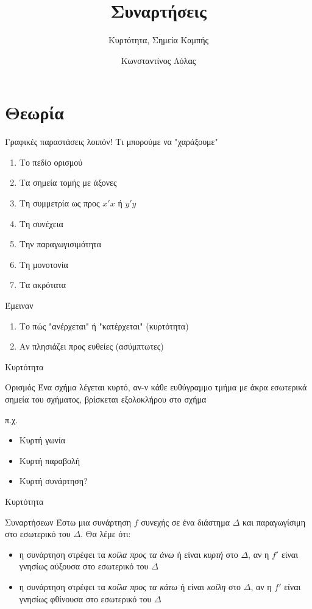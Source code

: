 \documentclass{../presentation}
\title{Συναρτήσεις}
\subtitle{Κυρτότητα, Σημεία Καμπής}
\author[Λόλας]{Κωνσταντίνος Λόλας}
\institute[$10^ο$ ΓΕΛ]{$10^ο$ ΓΕΛ Θεσσαλονίκης}
\date{}
\begin{document}
\begin{frame}
  \titlepage
\end{frame}

\section{Θεωρία}
\begin{frame}{Γραφικές παραστάσεις λοιπόν!}
  Τι μπορούμε να "χαράξουμε"
  \begin{enumerate}
    \item Το πεδίο ορισμού
    \item Τα σημεία τομής με άξονες
    \item Τη συμμετρία ως προς $x'x$ ή $y'y$
    \item Τη συνέχεια
    \item Την παραγωγισιμότητα
    \item Τη μονοτονία
    \item Τα ακρότατα
  \end{enumerate}
   Έμειναν
  \begin{enumerate}
    \item<3-> Το πώς "ανέρχεται" ή "κατέρχεται" (κυρτότητα)
    \item<4-> Αν πλησιάζει προς ευθείες (ασύμπτωτες)
  \end{enumerate}
\end{frame}

\begin{frame}{Κυρτότητα}
  \begin{block}{Ορισμός}
    Ένα σχήμα λέγεται κυρτό, αν-ν κάθε ευθύγραμμο τμήμα με άκρα εσωτερικά σημεία του σχήματος, βρίσκεται εξολοκλήρου στο σχήμα
  \end{block}
   π.χ.
  \begin{itemize}
    \item<3-> Κυρτή γωνία 
    \item<5-> Κυρτή παραβολή 
    \item<7-> Κυρτή συνάρτηση?
  \end{itemize}
\end{frame}

\begin{frame}{Κυρτότητα}
  \begin{block}{Συναρτήσεων}
    Έστω μια συνάρτηση $f$ συνεχής σε ένα διάστημα $Δ$ και παραγωγίσιμη στο εσωτερικό του $Δ$. Θα λέμε ότι:
    \begin{itemize}
      \item η συνάρτηση στρέφει τα \emph{κοίλα προς τα άνω} ή είναι \emph{κυρτή} στο $Δ$, αν η $f'$ είναι γνησίως αύξουσα στο εσωτερικό του $Δ$
      \item η συνάρτηση στρέφει τα \emph{κοίλα προς τα κάτω} ή είναι \emph{κοίλη} στο $Δ$, αν η $f'$ είναι γνησίως φθίνουσα στο εσωτερικό του $Δ$
    \end{itemize}
  \end{block}
\end{frame}
\end{document}
